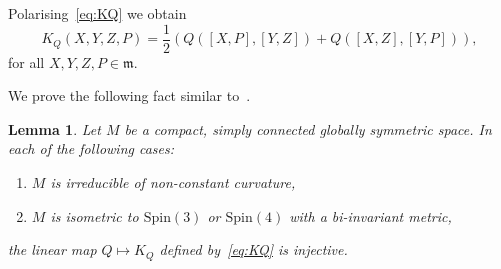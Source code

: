 \documentclass[12pt,reqno]{amsart}
\newcommand \Spin{\mathrm{Spin}}
\newcommand\m{\mathfrak m}
\newcommand \<{\langle}
\renewcommand \>{\rangle}
\newtheorem{lemma}{Lemma}
\theoremstyle{definition}
\theoremstyle{remark}
\begin{document}
	Polarising~\eqref{eq:KQ} we obtain
	\begin{equation}\label{eq:KQpolar}
		K_Q(X,Y,Z,P) = \frac12 (Q([X,P],[Y,Z]) + Q([X,Z],[Y,P])),
	\end{equation}
	for all $X,Y,Z,P \in \m$.
	
We prove the following fact similar to~\cite[Corollary~3]{EL}.
	\begin{lemma} \label{l:nosyz}
		Let $M$ be a compact, simply connected globally symmetric space. In each of the following cases:
        \begin{enumerate}[label=\emph{(\roman*)},ref=\roman*]
          \item \label{it:nosyzirred}
          $M$ is irreducible of non-constant curvature,

          \item \label{it:nosyzSpin}
          $M$ is isometric to $\Spin(3)$ or $\Spin(4)$ with a bi-invariant metric,
        \end{enumerate}
        the linear map $Q \mapsto K_Q$ defined by~\eqref{eq:KQ} is injective.
	\end{lemma}
\end{document}
